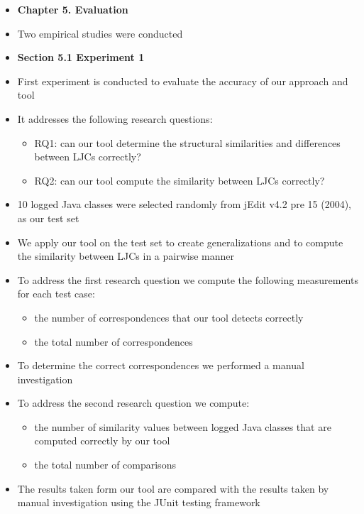 \documentclass{article}
\newcommand{\bold}{\textbf}
\newcommand{\tsc}{\textsc}
\begin{document}
\begin{itemize} [leftmargin=.1in]
\item \bold{Chapter 5. Evaluation}
\item Two empirical studies were conducted
\item \bold{Section 5.1 Experiment 1}
\item First experiment is conducted to evaluate the accuracy of our approach and tool
\item It addresses the following research questions:
\begin{itemize}
\item \tsc{RQ1: }can our tool determine the structural similarities and differences between LJCs correctly?
\item \tsc{RQ2: }can our tool compute the similarity between LJCs correctly?
\end{itemize}
\item 10 logged Java classes were selected randomly from jEdit v4.2 pre 15 (2004), as our test set
\item We apply our tool on the test set to create generalizations  and to compute the similarity between LJCs in a pairwise manner
\item To address the first research question we compute the following measurements for each test case:
\begin{itemize}
\item the number of correspondences that our tool detects correctly
\item the total number of correspondences
\end{itemize}
\item To determine the correct correspondences we performed a manual investigation
\item To address the second research question we compute:
\begin{itemize}
\item the number of similarity values between logged Java classes that are computed correctly by our tool
\item the total number of comparisons
\end{itemize}
\item The results taken form our tool are compared with the results taken by manual investigation using the JUnit testing framework


\end{itemize}
\end{document}
